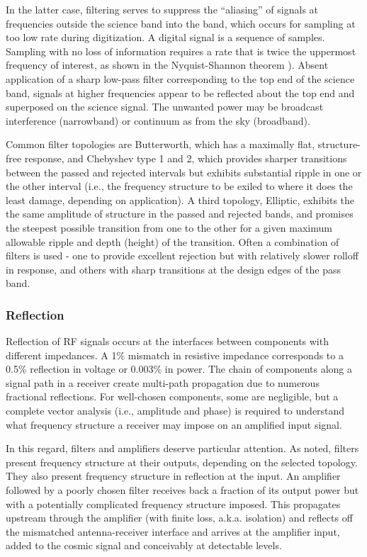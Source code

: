 In the latter case, filtering serves to suppress the ``aliasing'' of signals at frequencies outside the science band into the band, which occurs for sampling at too low rate during digitization.  A digital signal is a sequence of samples.  Sampling with no loss of information requires a rate that is twice the uppermost frequency of interest, as shown in the Nyquist-Shannon theorem \cite{TMS17}). Absent application of a sharp low-pass filter corresponding to the top end of the science band, signals at higher frequencies appear to be reflected about the top end and superposed on the science signal.  The unwanted power may be broadcast interference (narrowband) or continuum as from the sky (broadband).

 Common filter topologies are Butterworth, which has a maximally flat, structure-free response, and Chebyshev type 1 and 2, which provides sharper transitions between the passed and rejected intervals but exhibits substantial ripple in one or the other interval (i.e., the frequency structure to be exiled to where it does the least damage, depending on application).  A third topology, Elliptic, exhibits the the same amplitude of structure in the passed and rejected bands, and promises the steepest possible transition from one to the other for a given maximum allowable ripple and depth (height) of the transition.  Often a combination of filters is used - one to provide excellent rejection but with relatively slower rolloff in response, and others with sharp transitions at the design edges of the pass band.  
   
\subsubsection{Reflection}

Reflection of RF signals occurs at the interfaces between components with different impedances.  A 1\% mismatch in resistive impedance corresponds to a 0.5\% reflection in voltage or 0.003\% in power.  The chain of components along a signal path in a receiver create multi-path propagation due to numerous fractional reflections.  For well-chosen components, some are negligible, but a complete vector analysis (i.e., amplitude and phase) is required to understand what frequency structure a receiver may impose on an amplified input signal.  

In this regard, filters and amplifiers deserve particular attention.  As noted, filters present frequency structure at their outputs, depending on the selected topology.  They also present frequency structure in reflection at the input. An amplifier followed by a poorly chosen filter receives back a fraction of its output power but with a potentially complicated frequency structure imposed.  This propagates upstream through the amplifier (with finite loss, a.k.a. isolation) and reflects off the mismatched antenna-receiver interface and arrives at the amplifier input, added to the cosmic signal and conceivably at detectable levels.

